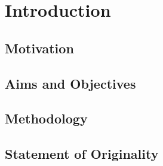 
\inbpdocument

\chapter{Introduction}
\label{cha:introduction}

\section{Motivation}
\label{sec:motivation}


\section{Aims and Objectives}
\label{sec:objectives}

\section{Methodology}
\label{sec:methodology}


\section{Statement of Originality}
%
%

\outbpdocument{
    
    
}
